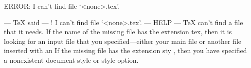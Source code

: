 ERROR: I can't find file `<none>.tex'.

--- TeX said ---
! I can't find file `<none>.tex'.
--- HELP ---
TeX can't find a file that it needs. If the name of the missing file
has the extension tex, then it is looking for an input file that you
specified---either your main file or another file inserted with an
  If the missing file has the extension sty
, then you have specified a nonexistent document style or style
option.